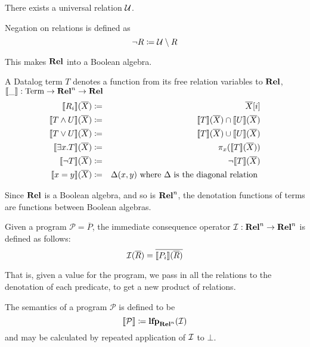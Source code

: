 \begin{defn}
  There exists a universal relation $\mathcal{U}$.
  
  Negation on relations is defined as $$\neg R \coloneqq \mathcal{U} \setminus R$$
\end{defn}

This makes $\mathbf{Rel}$ into a Boolean algebra.

\begin{defn}
  A Datalog term $T$ denotes a function from its free relation variables to
  $\mathbf{Rel}$, $\llbracket \_ \rrbracket : \mathrm{Term} \rightarrow \mathbf{Rel}^n \rightarrow \mathbf{Rel}$
  \begin{eqnarray*}
    \llbracket R_i \rrbracket(\overline{X}) &\coloneqq& \overline{X}[i] \\
    \llbracket T \wedge U \rrbracket(\overline{X}) &\coloneqq& \llbracket T \rrbracket(\overline{X}) \cap  \llbracket U \rrbracket(\overline{X})\\
    \llbracket T \vee U \rrbracket(\overline{X}) &\coloneqq& \llbracket T \rrbracket(\overline{X}) \cup  \llbracket U \rrbracket(\overline{X})\\
    \llbracket \exists x. T \rrbracket(\overline{X}) &\coloneqq& \pi_x(\llbracket T \rrbracket(\overline{X}))\\
    \llbracket \neg T \rrbracket(\overline{X}) &\coloneqq& \neg \llbracket T \rrbracket(\overline{X})\\
    \llbracket x=y \rrbracket(\overline{X}) &\coloneqq& \Delta(x, y) \text{ where } \Delta \text{ is the diagonal relation }
  \end{eqnarray*}
\end{defn}

Since $\mathbf{Rel}$ is a Boolean algebra, and so is $\mathbf{Rel}^n$, the denotation
functions of terms are functions between Boolean algebras.

\begin{defn}
  Given a program $\mathcal{P} = \overline{P}$, the immediate consequence operator $\mathcal{I}: \mathbf{Rel}^n \rightarrow \mathbf{Rel}^n$ is defined as follows:
  $$\mathcal{I}(\overline{R}) = \overline{\llbracket P_i \rrbracket(\overline{R})}$$
\end{defn}

That is, given a value for the program, we pass in all the relations
to the denotation of each predicate, to get a new product of relations.

\begin{defn}
  The semantics of a program $\mathcal{P}$ is defined to be 
  $$\llbracket \mathcal{P} \rrbracket \coloneqq \textbf{lfp}_{\mathbf{Rel}^n}(\mathcal{I})$$
  and may be calculated by repeated application of $\mathcal{I}$ to $\bot$.
\end{defn}

